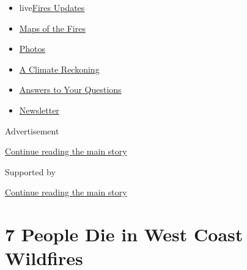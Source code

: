 \begin{itemize}
\tightlist
\item
  live\href{https://www.nytimes3xbfgragh.onion/2020/09/12/us/wildfires-live-updates.html?name=styln-california-wildfires\&region=TOP_BANNER\&block=storyline_menu_recirc\&action=click\&pgtype=Article\&impression_id=805849d0-f52b-11ea-bf06-e35e969503ac\&variant=undefined}{Fires
  Updates}
\item
  \href{https://www.nytimes3xbfgragh.onion/interactive/2020/us/fires-map-tracker.html?name=styln-california-wildfires\&region=TOP_BANNER\&block=storyline_menu_recirc\&action=click\&pgtype=Article\&impression_id=805849d1-f52b-11ea-bf06-e35e969503ac\&variant=undefined}{Maps
  of the Fires}
\item
  \href{https://www.nytimes3xbfgragh.onion/article/wildfires-photos-california-oregon-washington-state.html?name=styln-california-wildfires\&region=TOP_BANNER\&block=storyline_menu_recirc\&action=click\&pgtype=Article\&impression_id=805849d2-f52b-11ea-bf06-e35e969503ac\&variant=undefined}{Photos}
\item
  \href{https://www.nytimes3xbfgragh.onion/2020/09/10/us/climate-change-california-wildfires.html?name=styln-california-wildfires\&region=TOP_BANNER\&block=storyline_menu_recirc\&action=click\&pgtype=Article\&impression_id=805849d3-f52b-11ea-bf06-e35e969503ac\&variant=undefined}{A
  Climate Reckoning}
\item
  \href{https://www.nytimes3xbfgragh.onion/article/wildfires-california-oregon-washington.html?name=styln-california-wildfires\&region=TOP_BANNER\&block=storyline_menu_recirc\&action=click\&pgtype=Article\&impression_id=805849d4-f52b-11ea-bf06-e35e969503ac\&variant=undefined}{Answers
  to Your Questions}
\item
  \href{https://www.nytimes3xbfgragh.onion/2020/09/09/us/california-wildfires.html?name=styln-california-wildfires\&region=TOP_BANNER\&block=storyline_menu_recirc\&action=click\&pgtype=Article\&impression_id=805870e0-f52b-11ea-bf06-e35e969503ac\&variant=undefined}{Newsletter}
\end{itemize}

Advertisement

\protect\hyperlink{after-top}{Continue reading the main story}

Supported by

\protect\hyperlink{after-sponsor}{Continue reading the main story}

\hypertarget{7-people-die-in-west-coast-wildfires}{%
\section{7 People Die in West Coast
Wildfires}\label{7-people-die-in-west-coast-wildfires}}

